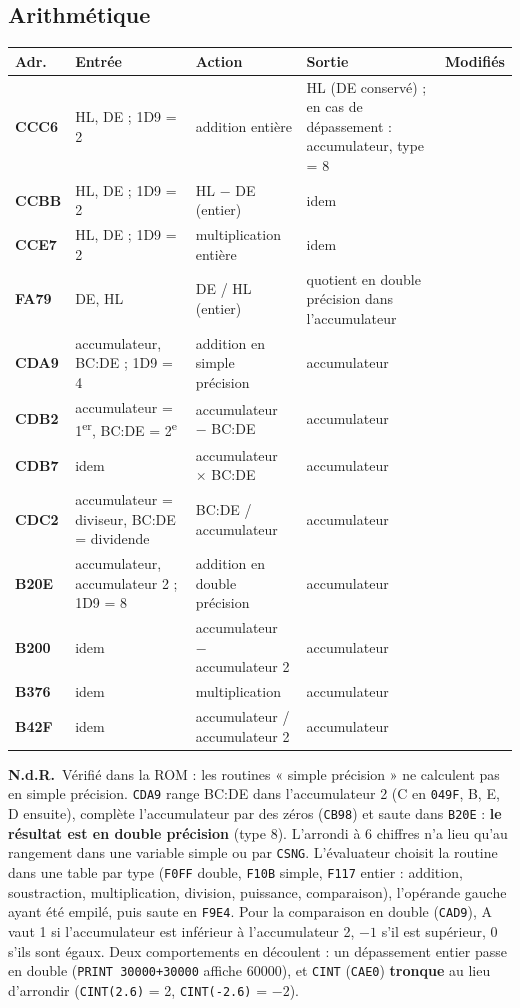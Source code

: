 \documentclass[a4paper,10pt]{article}
\makeatletter
\newcommand{\hex}[1]{\texttt{#1}}
\newcommand{\nota}[1]{\textcolor{red!60!black}{\small\textbf{N.d.R.}~#1}}
\newenvironment{routines}
  {\small\begin{longtable}{@{}>{\ttfamily\bfseries}p{1.1cm}>{\raggedright}p{4.0cm}>{\raggedright}p{5.0cm}>{\raggedright}p{3.1cm}>{\raggedright\arraybackslash}p{2.1cm}@{}}
   \toprule
   \normalfont\bfseries Adr. & \textbf{Entrée} & \textbf{Action} & \textbf{Sortie} & \textbf{Modifiés}\\
   \midrule\endhead
   \bottomrule\endfoot}
  {\end{longtable}}
\makeatother
\begin{document}
\subsection{Arithmétique}
\begin{routines}
CCC6 & HL, DE ; 1D9 = 2 & addition entière & HL (DE conservé) ; en cas de dépassement : accumulateur, type = 8 & \\
CCBB & HL, DE ; 1D9 = 2 & HL $-$ DE (entier) & idem & \\
CCE7 & HL, DE ; 1D9 = 2 & multiplication entière & idem & \\
FA79 & DE, HL & DE / HL (entier) & quotient en double précision dans l'accumulateur & \\
CDA9 & accumulateur, BC\string:DE ; 1D9 = 4 & addition en simple précision & accumulateur & \\
CDB2 & accumulateur = 1\textsuperscript{er}, BC\string:DE = 2\textsuperscript{e} & accumulateur $-$ BC\string:DE & accumulateur & \\
CDB7 & idem & accumulateur $\times$ BC\string:DE & accumulateur & \\
CDC2 & accumulateur = diviseur, BC\string:DE = dividende & BC\string:DE / accumulateur & accumulateur & \\
B20E & accumulateur, accumulateur 2 ; 1D9 = 8 & addition en double précision & accumulateur & \\
B200 & idem & accumulateur $-$ accumulateur 2 & accumulateur & \\
B376 & idem & multiplication & accumulateur & \\
B42F & idem & accumulateur / accumulateur 2 & accumulateur & \\
\end{routines}
\nota{Vérifié dans la ROM : les routines « simple précision » ne calculent pas
en simple précision. \hex{CDA9} range BC:DE dans l'accumulateur 2 (C en
\hex{049F}, B, E, D ensuite), complète l'accumulateur par des zéros
(\hex{CB98}) et saute dans \hex{B20E} : \textbf{le résultat est en double
précision} (type 8). L'arrondi à 6 chiffres n'a lieu qu'au rangement dans une
variable simple ou par \texttt{CSNG}. L'évaluateur choisit la routine dans une
table par type (\hex{F0FF} double, \hex{F10B} simple, \hex{F117} entier :
addition, soustraction, multiplication, division, puissance, comparaison),
l'opérande gauche ayant été empilé, puis saute en \hex{F9E4}. Pour la
comparaison en double (\hex{CAD9}), A vaut 1 si l'accumulateur est inférieur à
l'accumulateur 2, $-1$ s'il est supérieur, 0 s'ils sont égaux. Deux
comportements en découlent : un dépassement entier passe en double
(\texttt{PRINT 30000+30000} affiche 60000), et \texttt{CINT} (\hex{CAE0})
\textbf{tronque} au lieu d'arrondir (\texttt{CINT(2.6)} = 2,
\texttt{CINT(-2.6)} = $-2$).}
\end{document}
